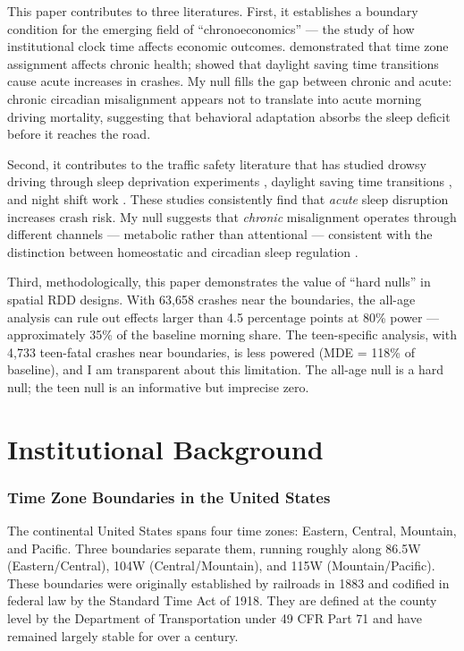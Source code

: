 \documentclass[12pt]{article}
\begin{document}
This paper contributes to three literatures. First, it establishes a boundary condition for the emerging field of ``chronoeconomics'' --- the study of how institutional clock time affects economic outcomes. \citet{giuntella2019sunset} demonstrated that time zone assignment affects chronic health; \citet{smith2016tz} showed that daylight saving time transitions cause acute increases in crashes. My null fills the gap between chronic and acute: chronic circadian misalignment appears not to translate into acute morning driving mortality, suggesting that behavioral adaptation absorbs the sleep deficit before it reaches the road.

Second, it contributes to the traffic safety literature that has studied drowsy driving through sleep deprivation experiments \citep{williamson2000moderate}, daylight saving time transitions \citep{smith2016tz, jin2017daylight}, and night shift work \citep{folkard1997black}. These studies consistently find that \textit{acute} sleep disruption increases crash risk. My null suggests that \textit{chronic} misalignment operates through different channels --- metabolic rather than attentional --- consistent with the distinction between homeostatic and circadian sleep regulation \citep{borbely1982sleep}.

Third, methodologically, this paper demonstrates the value of ``hard nulls'' in spatial RDD designs. With 63,658 crashes near the boundaries, the all-age analysis can rule out effects larger than 4.5 percentage points at 80\% power --- approximately 35\% of the baseline morning share. The teen-specific analysis, with 4,733 teen-fatal crashes near boundaries, is less powered (MDE = 118\% of baseline), and I am transparent about this limitation. The all-age null is a hard null; the teen null is an informative but imprecise zero.

\section{Institutional Background}

\subsubsection*{Time Zone Boundaries in the United States} The continental United States spans four time zones: Eastern, Central, Mountain, and Pacific. Three boundaries separate them, running roughly along 86.5\textdegree{}W (Eastern/Central), 104\textdegree{}W (Central/Mountain), and 115\textdegree{}W (Mountain/Pacific). These boundaries were originally established by railroads in 1883 and codified in federal law by the Standard Time Act of 1918. They are defined at the county level by the Department of Transportation under 49 CFR Part 71 and have remained largely stable for over a century.
\end{document}

